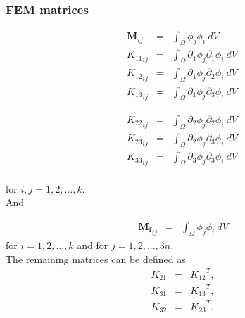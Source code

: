 \subsubsection{FEM matrices}
\noindent\begin{minipage}{.5\linewidth}
	\begin{eqnarray*}
		\mathbf{M}_{ij} & = & \int_{\Omega} \phi_j \phi_i \ dV \ \\
		{K_{11}}_{ij} & = & \int_{\Omega} \partial_1\phi_j \partial_1\phi_i \ dV \  \\
		{K_{12}}_{ij} & = & \int_{\Omega} \partial_1\phi_j \partial_2\phi_i \ dV \ \\
		{K_{13}}_{ij} & = & \int_{\Omega} \partial_1\phi_j \partial_3\phi_i \ dV \ 
	\end{eqnarray*}
\end{minipage}%
\begin{minipage}{.5\linewidth}
	\begin{eqnarray*}
		{K_{22}}_{ij} & = & \int_{\Omega} \partial_2\phi_j \partial_2\phi_i \ dV \  \\
		{K_{23}}_{ij} & = & \int_{\Omega} \partial_2\phi_j \partial_3\phi_i \ dV \ \\
		{K_{33}}_{ij} & = & \int_{\Omega} \partial_3\phi_j \partial_3\phi_i \ dV \ \\
	\end{eqnarray*}
\end{minipage}
for $i,j = 1,2,...,k.$\\

And

\begin{eqnarray*}
	\mathbf{M_f}_{ij} & = & \int_{\Omega} \phi_j \phi_i \ dV
\end{eqnarray*}
for $i = 1,2,...,k$ and for $j = 1,2,...,3n.$\\

The remaining matrices can be defined as
\begin{eqnarray*}
	{K_{21}} & = & {K_{12}}^{T},\\
	{K_{31}} & = & {K_{13}}^{T}, \\
	{K_{32}} & = & {K_{23}}^{T}. \\
\end{eqnarray*}

